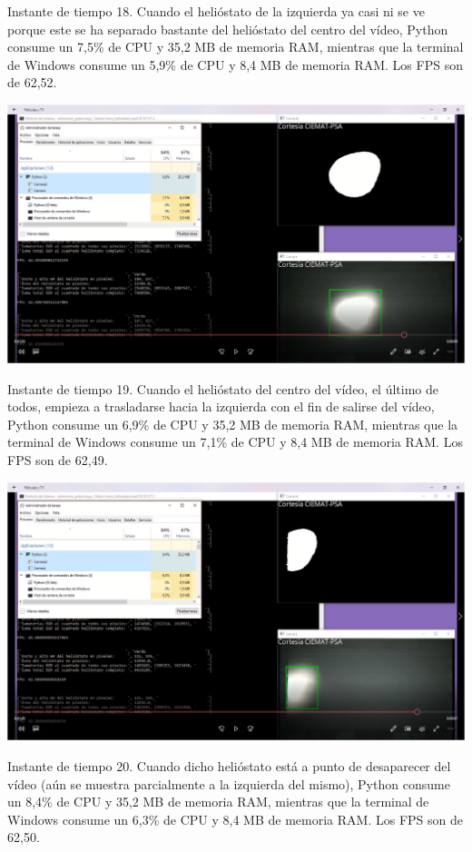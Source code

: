 \documentclass[12pt]{article}
\begin{document}
Instante de tiempo 18. Cuando el helióstato de la izquierda ya casi ni se ve porque este se ha separado bastante del helióstato del centro del vídeo, Python consume un 7,5\% de CPU y 35,2 MB de memoria RAM, mientras que la terminal de Windows consume un 5,9\% de CPU y 8,4 MB de memoria RAM. Los FPS son de 62,52.


\includegraphics[width=\textwidth]{CapturasRendimientoSoftware1/Imagen19.png}

Instante de tiempo 19. Cuando el helióstato del centro del vídeo, el último de todos, empieza a trasladarse hacia la izquierda con el fin de salirse del vídeo, Python consume un 6,9\% de CPU y 35,2 MB de memoria RAM, mientras que la terminal de Windows consume un 7,1\% de CPU y 8,4 MB de memoria RAM. Los FPS son de 62,49.


\includegraphics[width=\textwidth]{CapturasRendimientoSoftware1/Imagen20.png}

Instante de tiempo 20. Cuando dicho helióstato está a punto de desaparecer del vídeo (aún se muestra parcialmente a la izquierda del mismo), Python consume un 8,4\% de CPU y 35,2 MB de memoria RAM, mientras que la terminal de Windows consume un 6,3\% de CPU y 8,4 MB de memoria RAM. Los FPS son de 62,50.
\end{document}
